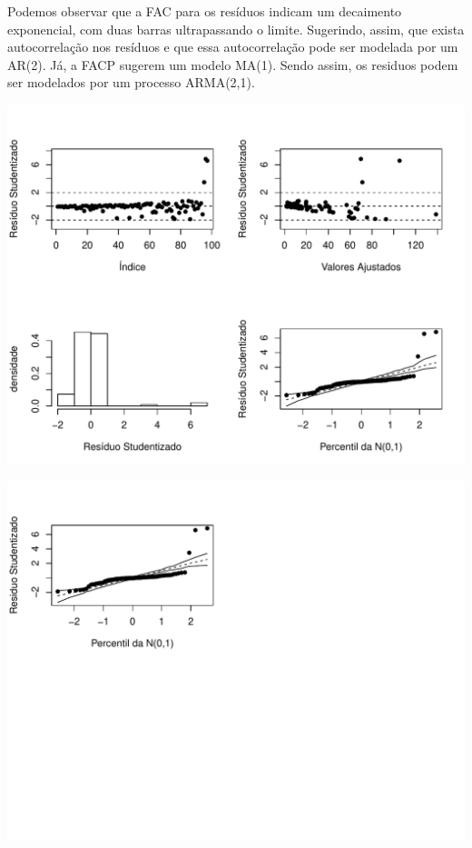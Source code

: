 \documentclass[runningheads]{llncs}\usepackage[]{graphicx}\usepackage[]{color}
\makeatletter
\def\maxwidth{ %
  \ifdim\Gin@nat@width>\linewidth
    \linewidth
  \else
    \Gin@nat@width
  \fi
}
\newenvironment{knitrout}{}{} %
\makeatother
\begin{document}
Podemos observar que a FAC para os resíduos indicam um decaimento exponencial, com duas barras ultrapassando o limite. Sugerindo, assim, que exista autocorrelação nos resíduos e que essa autocorrelação pode ser modelada por um AR(2). 
Já, a FACP sugerem um modelo MA(1). Sendo assim, os residuos podem ser modelados por um processo ARMA(2,1).


\begin{knitrout}
\color{fgcolor}
\includegraphics[width=\maxwidth]{figure/unnamed-chunk-20-1} 

\includegraphics[width=\maxwidth]{figure/unnamed-chunk-20-2} 

\end{knitrout}
\end{document}
